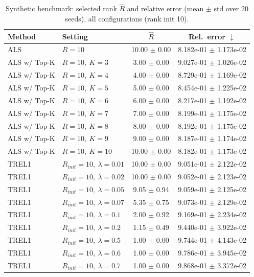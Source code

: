 \begin{table}[t]
\centering
\caption{Synthetic benchmark: selected rank \(\hat R\) and relative error (mean \(\pm\) std over \(20\) seeds), all configurations (rank init 10).}
\label{tab:results_synth_all}
\begin{tabular}{@{}llcc@{}}
\toprule
Method & Setting & \(\hat R\) & Rel.\ error \(\downarrow\) \\ \midrule
ALS & \(R=10\) & 10.00 $\pm$ 0.00 & 8.182e-01 $\pm$ 1.173e-02 \\
ALS w/ Top-K & \(R=10,\ K=3\) & 3.00 $\pm$ 0.00 & 9.027e-01 $\pm$ 1.026e-02 \\
ALS w/ Top-K & \(R=10,\ K=4\) & 4.00 $\pm$ 0.00 & 8.729e-01 $\pm$ 1.169e-02 \\
ALS w/ Top-K & \(R=10,\ K=5\) & 5.00 $\pm$ 0.00 & 8.454e-01 $\pm$ 1.225e-02 \\
ALS w/ Top-K & \(R=10,\ K=6\) & 6.00 $\pm$ 0.00 & 8.217e-01 $\pm$ 1.192e-02 \\
ALS w/ Top-K & \(R=10,\ K=7\) & 7.00 $\pm$ 0.00 & 8.199e-01 $\pm$ 1.175e-02 \\
ALS w/ Top-K & \(R=10,\ K=8\) & 8.00 $\pm$ 0.00 & 8.192e-01 $\pm$ 1.175e-02 \\
ALS w/ Top-K & \(R=10,\ K=9\) & 9.00 $\pm$ 0.00 & 8.187e-01 $\pm$ 1.174e-02 \\
ALS w/ Top-K & \(R=10,\ K=10\) & 10.00 $\pm$ 0.00 & 8.182e-01 $\pm$ 1.173e-02 \\
TREL1 & \(R_{init}=10,\ \lambda=0.01\) & 10.00 $\pm$ 0.00 & 9.051e-01 $\pm$ 2.122e-02 \\
TREL1 & \(R_{init}=10,\ \lambda=0.02\) & 10.00 $\pm$ 0.00 & 9.052e-01 $\pm$ 2.123e-02 \\
TREL1 & \(R_{init}=10,\ \lambda=0.05\) & 9.05 $\pm$ 0.94 & 9.059e-01 $\pm$ 2.125e-02 \\
TREL1 & \(R_{init}=10,\ \lambda=0.07\) & 5.35 $\pm$ 0.75 & 9.073e-01 $\pm$ 2.129e-02 \\
TREL1 & \(R_{init}=10,\ \lambda=0.1\) & 2.00 $\pm$ 0.92 & 9.169e-01 $\pm$ 2.234e-02 \\
TREL1 & \(R_{init}=10,\ \lambda=0.2\) & 1.15 $\pm$ 0.49 & 9.440e-01 $\pm$ 3.922e-02 \\
TREL1 & \(R_{init}=10,\ \lambda=0.5\) & 1.00 $\pm$ 0.00 & 9.744e-01 $\pm$ 4.143e-02 \\
TREL1 & \(R_{init}=10,\ \lambda=0.6\) & 1.00 $\pm$ 0.00 & 9.786e-01 $\pm$ 3.945e-02 \\
TREL1 & \(R_{init}=10,\ \lambda=0.7\) & 1.00 $\pm$ 0.00 & 9.868e-01 $\pm$ 3.372e-02 \\

\end{tabular}
\end{table}
